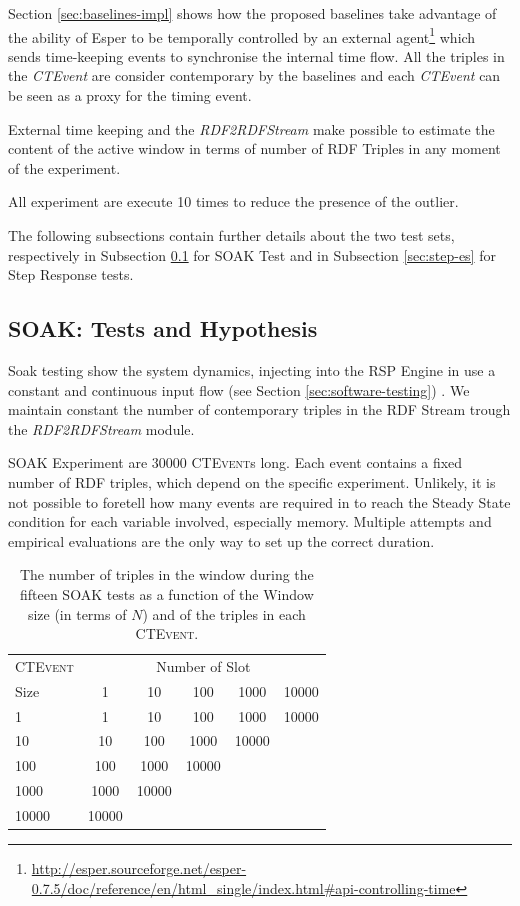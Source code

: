 Section \ref{sec:baselines-impl} shows how the proposed baselines take advantage of the ability of Esper to be temporally controlled by an external agent\footnote{\url{http://esper.sourceforge.net/esper-0.7.5/doc/reference/en/html_single/index.html#api-controlling-time}} which sends time-keeping events to synchronise the internal time flow. All the triples in the \textit{CTEvent} are consider contemporary by the baselines and each \textit{CTEvent} can be seen as a proxy for the timing event. 

External time keeping and the \textit{RDF2RDFStream} make possible to estimate the content of the active window in terms of number of RDF Triples in any moment of the experiment.

All experiment are execute 10 times to reduce the presence of the outlier.

The following subsections contain further details about the two test sets, respectively in Subsection \ref{sec:soak-es} for SOAK Test and in Subsection \ref{sec:step-es} for Step Response tests.

\subsection{SOAK: Tests and Hypothesis}\label{sec:soak-es}

Soak testing show the system dynamics, injecting into the RSP Engine in use a constant and continuous input flow (see Section \ref{sec:software-testing}) . We maintain constant the number of contemporary triples in the RDF Stream trough the \textit{RDF2RDFStream} module. %

SOAK Experiment are 30000 \textsc{CTEvent}s long. Each event contains a fixed number of RDF triples, which depend on the specific experiment. Unlikely, it is not possible to foretell how many events are required in to reach the Steady State condition for each variable involved, especially memory. Multiple attempts and empirical evaluations are the only way to set up the correct duration.

\begin{table}[htb]
\centering
\normalsize
 \begin{tabular}{l| ccccc}
	  	\hline
		\textsc{CTEvent}  &\multicolumn{5}{c}{Number of Slot}  \\
		Size  & 1 & 10 & 100 & 1000&10000 \\
		\hline	
		1 & 1& 10 & 100 & 1000&10000 \\
		10  & 10 & 100 & 1000&10000 \\
		100 & 100&1000&10000  \\
		1000 &1000 & 10000 \\
		10000&10000  \\
		\hline 
	\end{tabular}
	
	 \vspace{10pt}
	\caption[SOAK Tests Summary Table]{The number of triples in the window during the fifteen SOAK tests as a function of the Window size (in terms of $N$) and of the triples in each \textsc{CTEvent}.}
	\label{tab:soaktests}
\end{table}

